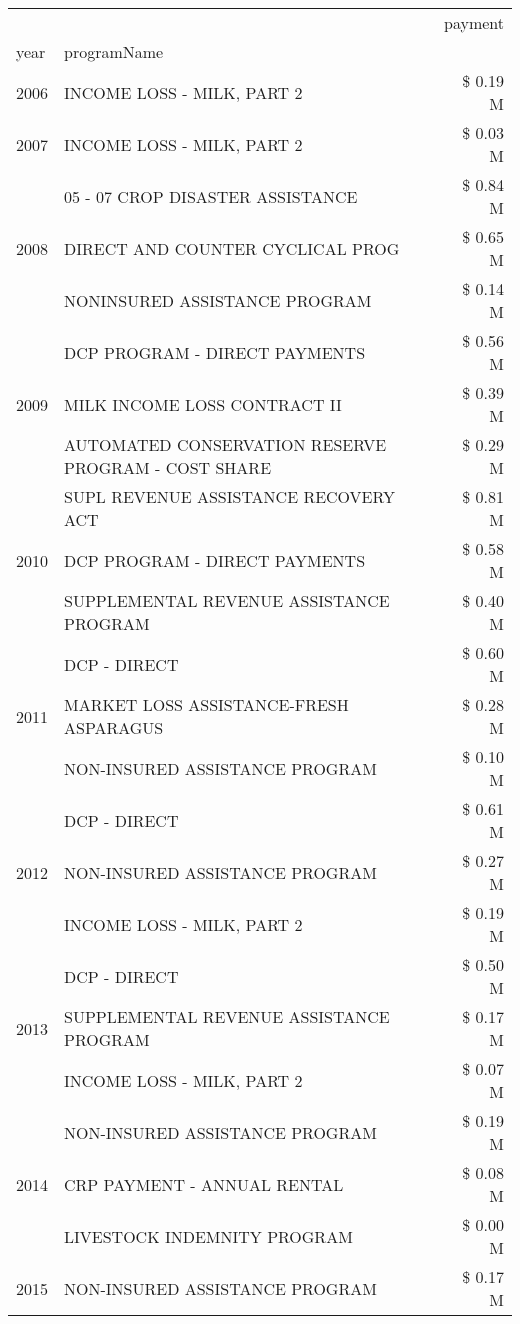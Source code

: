 \begin{tabular}{llr}
\toprule
 &  & payment \\
year & programName &  \\
\midrule
2006 & INCOME LOSS - MILK, PART 2 & \$ 0.19 M \\
\cline{1-3}
2007 & INCOME LOSS - MILK, PART 2 & \$ 0.03 M \\
\cline{1-3}
\multirow[t]{3}{*}{2008} & 05 - 07 CROP DISASTER ASSISTANCE & \$ 0.84 M \\
 & DIRECT AND COUNTER CYCLICAL PROG & \$ 0.65 M \\
 & NONINSURED ASSISTANCE PROGRAM & \$ 0.14 M \\
\cline{1-3}
\multirow[t]{3}{*}{2009} & DCP PROGRAM - DIRECT PAYMENTS & \$ 0.56 M \\
 & MILK INCOME LOSS CONTRACT II & \$ 0.39 M \\
 & AUTOMATED CONSERVATION RESERVE PROGRAM - COST SHARE & \$ 0.29 M \\
\cline{1-3}
\multirow[t]{3}{*}{2010} & SUPL REVENUE ASSISTANCE RECOVERY ACT & \$ 0.81 M \\
 & DCP PROGRAM - DIRECT PAYMENTS & \$ 0.58 M \\
 & SUPPLEMENTAL REVENUE ASSISTANCE PROGRAM & \$ 0.40 M \\
\cline{1-3}
\multirow[t]{3}{*}{2011} & DCP - DIRECT & \$ 0.60 M \\
 & MARKET LOSS ASSISTANCE-FRESH ASPARAGUS & \$ 0.28 M \\
 & NON-INSURED ASSISTANCE PROGRAM & \$ 0.10 M \\
\cline{1-3}
\multirow[t]{3}{*}{2012} & DCP - DIRECT & \$ 0.61 M \\
 & NON-INSURED ASSISTANCE PROGRAM & \$ 0.27 M \\
 & INCOME LOSS - MILK, PART 2 & \$ 0.19 M \\
\cline{1-3}
\multirow[t]{3}{*}{2013} & DCP - DIRECT & \$ 0.50 M \\
 & SUPPLEMENTAL REVENUE ASSISTANCE PROGRAM & \$ 0.17 M \\
 & INCOME LOSS - MILK, PART 2 & \$ 0.07 M \\
\cline{1-3}
\multirow[t]{3}{*}{2014} & NON-INSURED ASSISTANCE PROGRAM & \$ 0.19 M \\
 & CRP PAYMENT - ANNUAL RENTAL & \$ 0.08 M \\
 & LIVESTOCK INDEMNITY PROGRAM & \$ 0.00 M \\
\cline{1-3}
\multirow[t]{3}{*}{2015} & NON-INSURED ASSISTANCE PROGRAM & \$ 0.17 M \\

\end{tabular}
